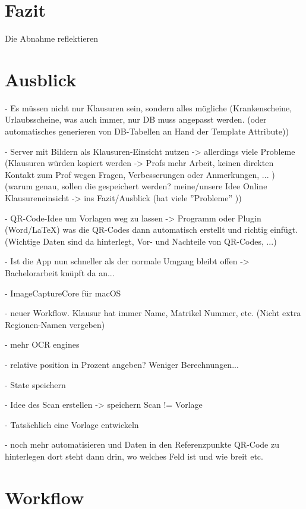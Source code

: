 \documentclass[nomenclature, oneside, 150]{HSMW-Thesis}
\begin{document}

\chapter{Fazit}
	Die Abnahme reflektieren 


		
\chapter{Ausblick}
	- Es müssen nicht nur Klausuren sein, sondern alles mögliche (Krankenscheine, Urlaubsscheine, was auch immer, nur DB muss angepasst werden. (oder automatisches generieren von DB-Tabellen an Hand der Template Attribute))
	
	- Server mit Bildern als Klausuren-Einsicht nutzen -> allerdings viele Probleme (Klausuren würden kopiert werden -> Profs mehr Arbeit, keinen direkten Kontakt zum Prof wegen Fragen, Verbesserungen oder Anmerkungen, ... )
	  (warum genau, sollen die gespeichert werden? meine/unsere Idee Online Klausureneinsicht -> ins Fazit/Ausblick (hat viele ''Probleme'' ))
	
	- QR-Code-Idee um Vorlagen weg zu lassen -> Programm oder Plugin (Word/LaTeX) was die QR-Codes dann automatisch erstellt und richtig einfügt. (Wichtige Daten sind da hinterlegt, Vor- und Nachteile von QR-Codes, ...)
	
	- Ist die App nun schneller als der normale Umgang bleibt offen -> Bachelorarbeit knüpft da an...
	
	- ImageCaptureCore für macOS
	
	- neuer Workflow. Klausur hat immer Name, Matrikel Nummer, etc. (Nicht extra Regionen-Namen vergeben)
	
	- mehr OCR engines
	
	- relative position in Prozent angeben? Weniger Berechnungen...
	
	- State speichern
	
	- Idee des Scan erstellen -> speichern Scan != Vorlage
	
	- Tatsächlich eine Vorlage entwickeln
	
	- noch mehr automatisieren und Daten in den Referenzpunkte QR-Code zu hinterlegen dort steht dann drin, wo welches Feld ist und wie breit etc. 

\Anhang

\chapter{Workflow} \label{ch:workflow}
\end{document}
